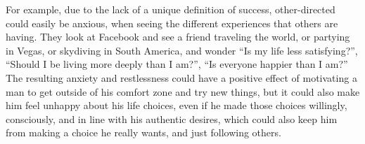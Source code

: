 For example, due to the lack of a unique definition of success, other-directed could easily be anxious, when seeing the different experiences that others are having. They look at Facebook and see a friend traveling the world, or partying in Vegas, or skydiving in South America, and wonder ``Is my life less satisfying?'', ``Should I be living more deeply than I am?'', ``Is everyone happier than I am?'' The resulting anxiety and restlessness could have a positive effect of motivating a man to get outside of his comfort zone and try new things, but it could also make him feel unhappy about his life choices, even if he made those choices willingly, consciously, and in line with his authentic desires, which could also keep him from making a choice he really wants, and just following others.









			
